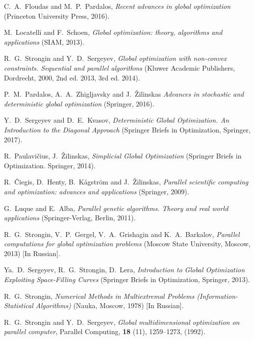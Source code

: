 \documentclass[12pt]{amsart}
\begin{document}
\begin{thebibliography}{20}

C.~A.~Floudas and M.~P.~Pardalos, \textit{Recent advances in global optimization} (Princeton University Press, 2016).

M.~Locatelli and F.~Schoen, \textit{Global optimization: theory, algorithms and applications} (SIAM, 2013).

R.~G.~Strongin and Y.~D.~Sergeyev, \textit{Global optimization with non-convex constraints. Sequential and parallel algorithms} (Kluwer Academic Publishers, Dordrecht, 2000, 2nd ed. 2013, 3rd ed. 2014).

P.~M.~Pardalos, A.~A.~Zhigljavsky and J.~\v{Z}ilinskas \textit{Advances in stochastic and deterministic global optimization} (Springer, 2016).

Y.~D.~Sergeyev and D.~E.~Kvasov, \textit{Deterministic Global Optimization. An Introduction to the Diagonal Approach}  (Springer Briefs in Optimization, Springer, 2017).

R.~Paulavi\v{c}ius, J.~\v{Z}ilinskas, \textit{Simplicial Global Optimization} (Springer Briefs in Optimization. Springer, 2014).

R.~\v{C}iegis, D.~Henty, B.~K\r{a}gstr\"om and J.~\v{Z}ilinskas, \textit{Parallel scientific computing and optimization: advances and applications}  (Springer, 2009). 

G.~Luque and E.~Alba, \textit{Parallel genetic algorithms. Theory and real world applications} (Springer-Verlag, Berlin, 2011).

R.~G.~Strongin, V.~P.~Gergel, V.~A.~Grishagin and K.~A.~Barkalov, \textit{Parallel computations for global optimization problems} (Moscow State University, Moscow, 2013) [In Russian].

Ya.~D.~Sergeyev, R.~G.~Strongin, D.~Lera, \textit{Introduction to Global Optimization Exploiting Space-Filling Curves} (Springer Briefs in Optimization, Springer, 2013).

R.~G.~Strongin, \textit{Numerical Methods in Multiextremal Problems (Information-Statistical Algorithms)} (Nauka, Moscow, 1978) [In Russian].

R.~G.~Strongin and Y.~D.~Sergeyev, \textit{Global multidimensional optimization on parallel computer}, Parallel Computing, \textbf{18} (11), 1259--1273, (1992).


\end{thebibliography}
\end{document}
